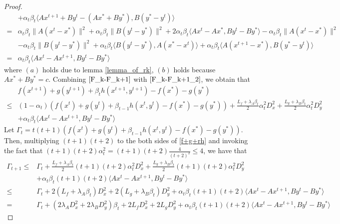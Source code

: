 \documentclass{article}
\numberwithin{equation}{section}
\begin{document}
\begin{proof}
\begin{align}
        &+ \alpha_t\beta_{t}\langle Ax^{t+1} +By^t-(Ax^*+By^*), B(y^*-y^t) \rangle \nonumber \\
        =& {\alpha_t\beta_{t}}\|A(x^t-x^*)\rVert^2 + {\alpha_t\beta_{t}}\|B(y^t-y^*)\rVert^2 +2\alpha_t\beta_{t}\langle Ax^t-Ax^*, By^t-By^*\rangle -\alpha_t\beta_{t}\|A(x^t-x^*)\rVert^2       \nonumber \\
        & -\alpha_t\beta_{t}\|B(y^t-y^*)\rVert^2 +\alpha_t\beta_{t}\langle B(y^t-y^*), A(x^*-x^t) \rangle +\alpha_t\beta_{t}\langle A(x^{t+1}-x^*), B(y^*-y^t) \rangle  \nonumber \\
        =&\alpha_t\beta_t \langle Ax^t -Ax^{t+1}, By^t-By^* \rangle \label{F_k-F_k+1_2}
    \end{align} 
    where $(a)$ holds due to lemma \ref{lemma_of_rk}, $(b)$ holds because $Ax^*+ By^* =c$. 
    Combining  $\eqref{F_k-F_k+1}$ with $\eqref{F_k-F_k+1_2}$, we obtain that 
    \begin{align}
        &f(x^{t+1}) +g(y^{t+1}) +\beta_{t}h(x^{t+1},y^{t+1}) -f(x^*) -g(y^*) \nonumber \\
        \leq& (1-\alpha_t)\left(f(x^t) +g(y^t)+\beta_{t-1}h(x^t,y^t) -f(x^*)-g(y^*)\right) + \frac{L_f+\lambda_{A} \beta_{t}}{2}\alpha_t^2D_x^2+ \frac{L_g +\lambda_{B} \beta_{t}}{2}\alpha_t^2D_y^2 \nonumber \\
        &+\alpha_t\beta_{t}\langle Ax^t-Ax^{t+1}, By^t-By^*\rangle \label{f+g+rh}
    \end{align}
    Let $\Gamma_t =t(t+1) \left(f(x^t) +g(y^t)+\beta_{t-1}h(x^t,y^t) -f(x^*)-g(y^*)\right)$. 
    Then, multiplying $(t+1)(t+2)$ to the both sides of \eqref{f+g+rh} and invoking the fact that 
    $(t+1)(t+2)\alpha_t^2 = (t+1)(t+2)\frac{4}{(t+2)^2} \leq 4$, we have that 
    \begin{align}
        \Gamma_{t+1} \leq& \Gamma_t + \frac{L_f+\lambda_{A} \beta_{t}}{2}(t+1)(t+2)\alpha_t^2D_x^2+ \frac{L_g +\lambda_{B} \beta_{t}}{2}(t+1)(t+2)\alpha_t^2D_y^2 \nonumber \\
        & +\alpha_t\beta_{t} (t+1)(t+2)\langle Ax^t -Ax^{t+1}, By^t-By^{*} \rangle  \nonumber \\
        \leq& \Gamma_t + 2(L_f+\lambda_{A} \beta_{t})D_x^2+ 2(L_g +\lambda_{B} \beta_{t})D_y^2 +\alpha_t\beta_{t}(t+1)(t+2)\langle Ax^t- Ax^{t+1}, By^t-By^{*}\rangle \nonumber \\
        =& \Gamma_t + (2\lambda_{A} D_x^2+ 2\lambda_{B} D_y^2)\beta_{t} +2L_fD_x^2+2L_gD_y^2 + \alpha_t\beta_{t}(t+1)(t+2)\langle Ax^t- Ax^{t+1}, By^t-By^{*}\rangle 
    \end{align}

\end{proof}
\end{document}
